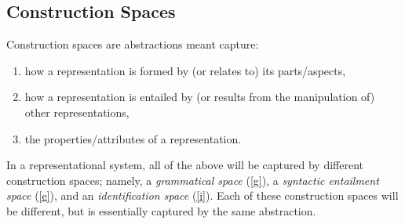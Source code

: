 \documentclass[a4paper]{article}
\theoremstyle{definition}
\begin{document}
	\subsection{Construction Spaces}
		Construction spaces are abstractions meant capture:
		\begin{enumerate}[itemsep=2pt]
			\item how a representation is formed by (or relates to) its parts/aspects, \label{g}
			\item how a representation is entailed by (or results from the manipulation of) other representations,\label{e}
			\item the properties/attributes of a representation.\label{i}
		\end{enumerate}

		In a representational system, all of the above will be captured by different construction spaces; namely, a \textit{grammatical space} (\ref{g}), a \textit{syntactic entailment space} (\ref{e}), and an \textit{identification space} (\ref{i}).
		Each of these construction spaces will be different, but is essentially captured by the same abstraction.
\end{document}
